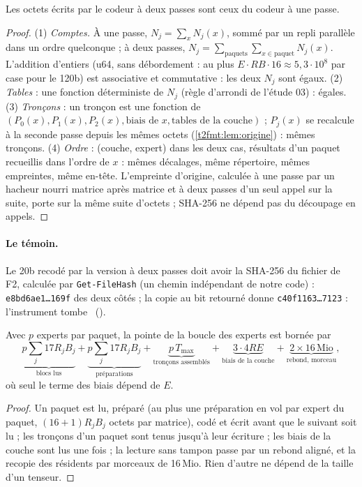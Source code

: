 \begin{proposition}\label{t2fmt:prop:identite}
Les octets écrits par le codeur à deux passes sont ceux du codeur à une passe.
\end{proposition}
\begin{proof}
(1) \emph{Comptes.} À une passe, $N_j = \sum_x N_j(x)$, sommé par un repli parallèle dans un ordre quelconque ; à deux passes, $N_j = \sum_{\text{paquets}} \sum_{x \in \text{paquet}} N_j(x)$. L'addition d'entiers (u64, sans débordement : au plus $E \cdot RB \cdot 16 \approx 5{,}3\cdot10^8$ par case pour le 120b) est associative et commutative : les deux $N_j$ sont égaux. (2) \emph{Tables} : une fonction déterministe de $N_j$ (règle d'arrondi de l'étude 03) : égales. (3) \emph{Tronçons} : un tronçon est une fonction de $(P_0(x), P_1(x), P_2(x), \text{biais de } x, \text{tables de la couche})$ ; $P_j(x)$ se recalcule à la seconde passe depuis les mêmes octets (\cref{t2fmt:lem:origine}) : mêmes tronçons. (4) \emph{Ordre} : (couche, expert) dans les deux cas, résultats d'un paquet recueillis dans l'ordre de $x$ : mêmes décalages, même répertoire, mêmes empreintes, même en-tête. L'empreinte d'origine, calculée à une passe par un hacheur nourri matrice après matrice et à deux passes d'un seul appel sur la suite, porte sur la même suite d'octets ; SHA-256 ne dépend pas du découpage en appels.
\end{proof}

\paragraph{Le témoin.} Le 20b recodé par la version à deux passes doit avoir la SHA-256 du fichier de F2, calculée par \texttt{Get-FileHash} (un chemin indépendant de notre code) : \texttt{e8bd6ae1…169f} des deux côtés ; la copie au bit retourné donne \texttt{c40f1163…7123} : l'instrument tombe \mes~().

\begin{proposition}\label{t2fmt:prop:memoire}
Avec $p$ experts par paquet, la pointe de la boucle des experts est bornée par
\[
\underbrace{p \sum_j 17 R_j B_j}_{\text{blocs lus}} + \underbrace{p \sum_j 17 R_j B_j}_{\text{préparations}} + \underbrace{p\, T_{\max}}_{\text{tronçons assemblés}} + \underbrace{3 \cdot 4 R E}_{\text{biais de la couche}} + \underbrace{2 \times 16\,\mathrm{Mio}}_{\text{rebond, morceau}},
\]
où seul le terme des biais dépend de $E$.
\end{proposition}
\begin{proof}
Un paquet est lu, préparé (au plus une préparation en vol par expert du paquet, $(16 + 1) R_j B_j$ octets par matrice), codé et écrit avant que le suivant soit lu ; les tronçons d'un paquet sont tenus jusqu'à leur écriture ; les biais de la couche sont lus une fois ; la lecture sans tampon passe par un rebond aligné, et la recopie des résidents par morceaux de 16\,Mio. Rien d'autre ne dépend de la taille d'un tenseur.
\end{proof}

